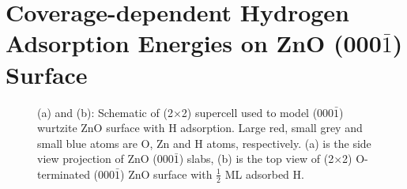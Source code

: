 \section{Coverage-dependent Hydrogen Adsorption Energies on ZnO (000$\bar{1}$) Surface}
\label{sec:Hcoverage}
\begingroup
\begin{figure}[!ht]
  \centering
  \label{Chap:ZnO_H:fig:ZnO}
  \label{Chap:ZnO_H:fig:ZnOSurf}
\caption[Schematic of (2$\times$2) supercell used to model  (000$\bar{1}$) wurtzite ZnO surface with H adsorption.]{(a) and (b): Schematic of (2$\times$2) supercell used to model  (000$\bar{1}$) wurtzite ZnO surface with H adsorption. Large red, small grey and small blue atoms are O, Zn and H atoms, respectively. (a) is the side view projection of ZnO (000$\bar{1}$) slabs, (b) is the top view of (2$\times$2) O-terminated (000$\bar{1}$)  ZnO surface with $\frac{1}{2}$ ML adsorbed H.}
\label{fig1}
\end{figure}
\endgroup

